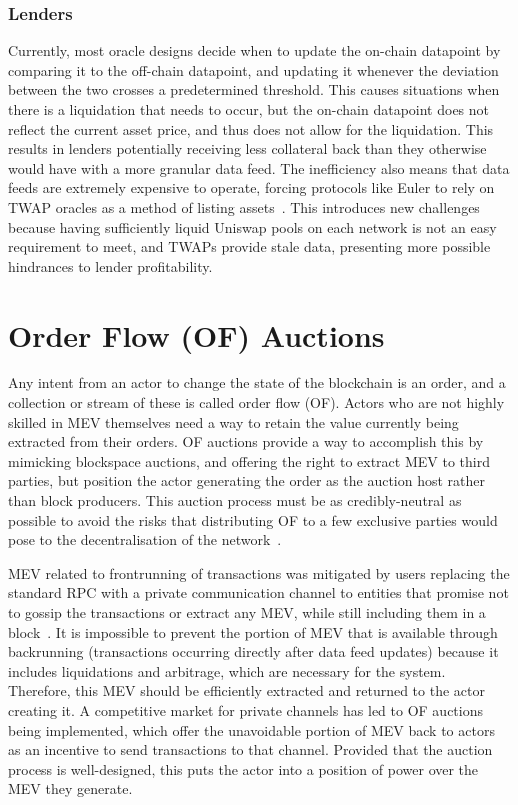 \documentclass[11pt]{article}
\begin{document}
\subsubsection{Lenders}

Currently, most oracle designs decide when to update the on-chain datapoint by comparing it to the off-chain datapoint, and updating it whenever the deviation between the two crosses a predetermined threshold.
This causes situations when there is a liquidation that needs to occur, but the on-chain datapoint does not reflect the current asset price, and thus does not allow for the liquidation.
This results in lenders potentially receiving less collateral back than they otherwise would have with a more granular data feed.
The inefficiency also means that data feeds are extremely expensive to operate, forcing protocols like Euler to rely on TWAP oracles as a method of listing assets~\cite{euler}.
This introduces new challenges because having sufficiently liquid Uniswap pools on each network is not an easy requirement to meet, and TWAPs provide stale data, presenting more possible hindrances to lender profitability.

\section{Order Flow (OF) Auctions}

Any intent from an actor to change the state of the blockchain is an order, and a collection or stream of these is called order flow (OF).
Actors who are not highly skilled in MEV themselves need a way to retain the value currently being extracted from their orders.
OF auctions provide a way to accomplish this by mimicking blockspace auctions, and offering the right to extract MEV to third parties, but position the actor generating the order as the auction host rather than block producers.
This auction process must be as credibly-neutral as possible to avoid the risks that distributing OF to a few exclusive parties would pose to the decentralisation of the network~\cite{flashbots-centralization-1}.

MEV related to frontrunning of transactions was mitigated by users replacing the standard RPC with a private communication channel to entities that promise not to gossip the transactions or extract any MEV, while still including them in a block~\cite{flashbots-protect}.
It is impossible to prevent the portion of MEV that is available through backrunning (transactions occurring directly after data feed updates) because it includes liquidations and arbitrage, which are necessary for the system.
Therefore, this MEV should be efficiently extracted and returned to the actor creating it.
A competitive market for private channels has led to OF auctions being implemented, which offer the unavoidable portion of MEV back to actors as an incentive to send transactions to that channel.
Provided that the auction process is well-designed, this puts the actor into a position of power over the MEV they generate. 
\end{document}

